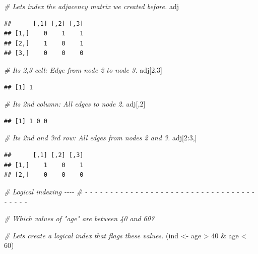 \documentclass[
]{book}
\newenvironment{Shaded}{\begin{snugshade}}{\end{snugshade}}
\newcommand{\CommentTok}[1]{\textcolor[rgb]{0.56,0.35,0.01}{\textit{#1}}}
\newcommand{\DecValTok}[1]{\textcolor[rgb]{0.00,0.00,0.81}{#1}}
\newcommand{\NormalTok}[1]{#1}
\newcommand{\OtherTok}[1]{\textcolor[rgb]{0.56,0.35,0.01}{#1}}
\newcommand{\SpecialCharTok}[1]{\textcolor[rgb]{0.00,0.00,0.00}{#1}}
\begin{document}
\begin{Shaded}
\begin{Highlighting}[]
\CommentTok{\# Let\textquotesingle{}s index the adjacency matrix we created before.}
\NormalTok{adj}
\end{Highlighting}
\end{Shaded}

\begin{verbatim}
##      [,1] [,2] [,3]
## [1,]    0    1    1
## [2,]    1    0    1
## [3,]    0    0    0
\end{verbatim}

\begin{Shaded}
\begin{Highlighting}[]
\CommentTok{\# Its 2,3 cell: Edge from node 2 to node 3.}
\NormalTok{adj[}\DecValTok{2}\NormalTok{,}\DecValTok{3}\NormalTok{]}
\end{Highlighting}
\end{Shaded}

\begin{verbatim}
## [1] 1
\end{verbatim}

\begin{Shaded}
\begin{Highlighting}[]
\CommentTok{\# Its 2nd column: All edges to node 2.}
\NormalTok{adj[,}\DecValTok{2}\NormalTok{]}
\end{Highlighting}
\end{Shaded}

\begin{verbatim}
## [1] 1 0 0
\end{verbatim}

\begin{Shaded}
\begin{Highlighting}[]
\CommentTok{\# Its 2nd and 3rd row: All edges from nodes 2 and 3.}
\NormalTok{adj[}\DecValTok{2}\SpecialCharTok{:}\DecValTok{3}\NormalTok{,]}
\end{Highlighting}
\end{Shaded}

\begin{verbatim}
##      [,1] [,2] [,3]
## [1,]    1    0    1
## [2,]    0    0    0
\end{verbatim}

\begin{Shaded}
\begin{Highlighting}[]
\CommentTok{\# Logical indexing                                                          {-}{-}{-}{-}}
\CommentTok{\# {-} {-} {-} {-} {-} {-} {-} {-} {-} {-} {-} {-} {-} {-} {-} {-} {-} {-} {-} {-} {-} {-} {-} {-} {-} {-} {-} {-} {-} {-} {-} {-} {-} {-} {-} {-} {-} {-} {-} }

\CommentTok{\# Which values of "age" are between 40 and 60?}

\CommentTok{\# Let\textquotesingle{}s create a logical index that flags these values.}
\NormalTok{(ind }\OtherTok{\textless{}{-}}\NormalTok{ age }\SpecialCharTok{\textgreater{}} \DecValTok{40} \SpecialCharTok{\&}\NormalTok{ age }\SpecialCharTok{\textless{}} \DecValTok{60}\NormalTok{)}
\end{Highlighting}
\end{Shaded}
\end{document}
